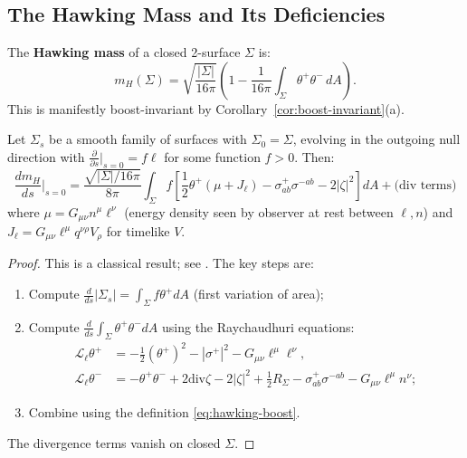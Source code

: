 \subsection{The Hawking Mass and Its Deficiencies}

\begin{definition}
\label{def:hawking-boost}
The \textbf{Hawking mass} of a closed 2-surface $\Sigma$ is:
\begin{equation}
m_H(\Sigma) = \sqrt{\frac{|\Sigma|}{16\pi}}\left(1 - \frac{1}{16\pi}\int_\Sigma \theta^+\theta^- \, dA\right).
\label{eq:hawking-boost}
\end{equation}
This is manifestly boost-invariant by Corollary~\ref{cor:boost-invariant}(a).
\end{definition}

\begin{theorem}
\label{thm:hawking-variation}
Let $\Sigma_s$ be a smooth family of surfaces with $\Sigma_0 = \Sigma$, evolving in the outgoing null direction with $\frac{\partial}{\partial s}\big|_{s=0} = f\ell$ for some function $f > 0$. Then:
\begin{equation}
\boxed{\frac{d m_H}{ds}\bigg|_{s=0} = \frac{\sqrt{|\Sigma|/16\pi}}{8\pi} \int_\Sigma f\left[\frac{1}{2}\theta^+(\mu + J_\ell) - \sigma^+_{ab}\sigma^{-ab} - 2|\zeta|^2\right] dA + \text{(div terms)}}
\label{eq:hawking-var}
\end{equation}
where $\mu = G_{\mu\nu}n^\mu\ell^\nu$ (energy density seen by observer at rest between $\ell, n$) and $J_\ell = G_{\mu\nu}\ell^\mu q^{\nu\rho}V_\rho$ for timelike $V$.
\end{theorem}

\begin{proof}
This is a classical result; see \cite{hayward1994,mars2009,bray2009}. The key steps are:
\begin{enumerate}
\item Compute $\frac{d}{ds}|\Sigma_s| = \int_\Sigma f\theta^+ dA$ (first variation of area);
\item Compute $\frac{d}{ds}\int_\Sigma \theta^+\theta^- dA$ using the Raychaudhuri equations:
\begin{align}
\mathcal{L}_\ell \theta^+ &= -\frac{1}{2}(\theta^+)^2 - |\sigma^+|^2 - G_{\mu\nu}\ell^\mu\ell^\nu, \\
\mathcal{L}_\ell \theta^- &= -\theta^+\theta^- + 2\text{div}\zeta - 2|\zeta|^2 + \frac{1}{2}R_\Sigma - \sigma^+_{ab}\sigma^{-ab} - G_{\mu\nu}\ell^\mu n^\nu;
\end{align}
\item Combine using the definition \eqref{eq:hawking-boost}.
\end{enumerate}
The divergence terms vanish on closed $\Sigma$.
\end{proof}

